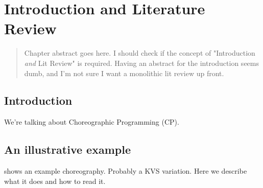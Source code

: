 \chapter{Introduction and Literature Review}

\begin{quote}
Chapter abstract goes here.
I should check if the concept of "Introduction \emph{and} Lit Review" is required.
Having an abstract for the introduction seems dumb, and I'm not sure I want a monolithic lit review up front.
\end{quote}

\section{Introduction}

We're talking about Choreographic Programming (CP).

\section{An illustrative example}

 shows an example choreography.
Probably a KVS variation.
Here we describe what it does and how to read it.


